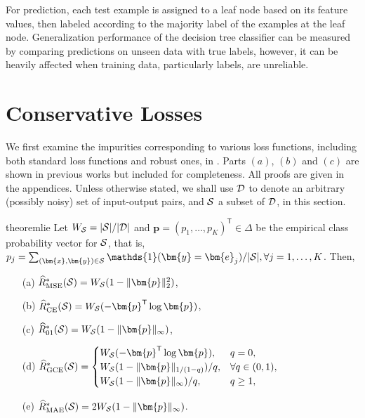 \documentclass[letterpaper]{article} %
\newcommand{\bx}{{\bm{x}}}
\newcommand{\bp}{{\bm{p}}}
\newcommand{\by}{{\bm{y}}}
\newcommand{\be}{{\bm{e}}}
\newcommand{\T}{{\mathsf{T}}}
\newcommand{\I}{\mathds{1}}
\newcommand{\cS}{{\cal{S}}}
\newcommand{\cD}{{\cal{D}}}
\newcommand{\simplex}{\Delta}
\begin{document}
For prediction, each test example is assigned to a leaf node based on its
feature values, then labeled according to the majority label of the examples at
the leaf node. 
Generalization performance of the decision tree classifier can be measured by
comparing predictions on unseen data with true labels, however, it can be
heavily affected when training data, particularly labels, are unreliable. 

\section{Conservative Losses}
\label{sec:theory}

We first examine the impurities corresponding to various loss functions,
including both standard loss functions and robust ones, in
.
Parts $(a)$, $(b)$ and $(c)$ are shown in previous works
\cite{breiman1984classification, painsky2018universality,yang2019robust,
wilton2022positive}
but included for completeness.
All proofs are given in the appendices.
Unless otherwise stated, we shall use $\cD$ to denote an arbitrary (possibly
noisy) set of input-output pairs, and $\cS$ a subset of $\cD$, in this section.

\begin{restatable}{theorem}{lie}
\label{thm:loss_impurity_equivalence}
    Let 
    $W_{\cS}=|\cS|/|\cD|$
    and 
    $\bp
    =(p_1,\ldots,p_K)^\T
    \in \simplex$ 
    be the empirical class probability vector for $\cS$, that is, 
    $p_j=\sum_{(\bx,\by)\in\cS}\I(\by=\be_j)/|\cS|,\forall j=1,\ldots,K$. 
    Then,

    \begin{enumerate}
        \item[(a)] $\widehat{R}_{\mathrm{MSE}}^*(\cS)=W_{\cS}(1-\|\bp\|_2^2)$,\label{result a}
        \item[(b)] $\widehat{R}_{\mathrm{CE}}^*(\cS)=W_{\cS}(-\bp^\T\log\bp)$,
        \item[(c)] $\widehat{R}_{\mathrm{01}}^*(\cS)=W_{\cS}(1-\|\bp\|_\infty)$,
        \item[(d)] $\widehat{R}_{\mathrm{GCE}}^*(\cS)
            =
            \begin{cases}
                W_{\cS}(-\bp^\T\log\bp), & q=0, \\
                W_{\cS}(1-\|\bp\|_{1/(1-q)})/q, & \forall q\in(0,1), \\
                W_{\cS}(1-\|\bp\|_\infty)/q, & q\geq 1,                 
            \end{cases}$
        \item[(e)] $\widehat{R}_{\mathrm{MAE}}^*(\cS)=2W_{\cS}(1-\|\bp\|_\infty)$.
    \end{enumerate}
\end{restatable}
\end{document}
